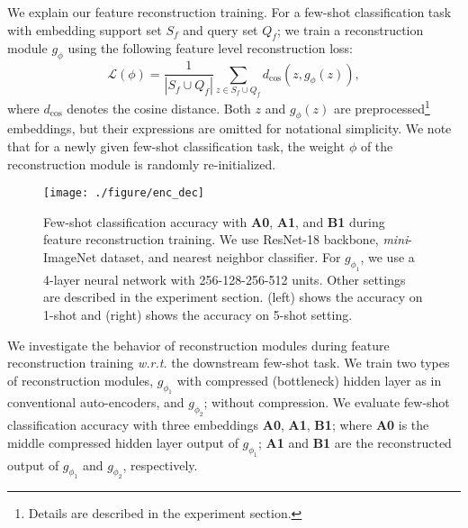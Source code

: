 \documentclass{article}
\begin{document}
We explain our feature reconstruction training.
For a few-shot classification task with embedding support set $S_f$ and query set $Q_f$; we train a reconstruction module $g_\phi$ using the following feature level reconstruction loss:
\begin{equation}
\mathcal{L}(\phi) = \frac{1}{|S_f\cup Q_f|}\sum_{z\in S_f\cup Q_f} d_\text{cos}(z, g_\phi(z)),
\end{equation}
where $d_\text{cos}$ denotes the cosine distance. Both $z$ and $g_\phi(z)$ are preprocessed\footnote{Details are described in the experiment section.} embeddings, but their expressions are omitted for notational simplicity. We note that for a newly given few-shot classification task, the weight $\phi$ of the reconstruction module is randomly re-initialized.

\begin{figure}[t]
	\vskip -0.1in
	\begin{center}
		\centerline{\texttt{[image: ./figure/enc\_dec]}}
		\vskip -0.15in
		\caption{
			Few-shot classification accuracy with \textbf{A0}, \textbf{A1}, and \textbf{B1} during feature reconstruction training. 
			We use ResNet-18 backbone, \textit{mini}-ImageNet dataset, and nearest neighbor classifier.
			For $g_{\phi_1}$, we use a 4-layer neural network with 256-128-256-512 units.
			Other settings are described in the experiment section.
			(left) shows the accuracy on 1-shot and (right) shows the accuracy on 5-shot setting.}
		\label{graph:training_dynamics}
	\end{center}
	\vskip -0.4in
\end{figure}
We investigate the behavior of reconstruction modules during feature reconstruction training \textit{w.r.t.} the downstream few-shot task. We train two types of reconstruction modules, $g_{\phi_1}$ with compressed (bottleneck) hidden layer as in conventional auto-encoders, and $g_{\phi_2}$; without compression. We evaluate few-shot classification accuracy with three embeddings \textbf{A0}, \textbf{A1}, \textbf{B1}; where \textbf{A0} is the middle compressed hidden layer output of $g_{\phi_1}$; \textbf{A1} and \textbf{B1} are the reconstructed output of $g_{\phi_1}$ and $g_{\phi_2}$, respectively.
\end{document}
